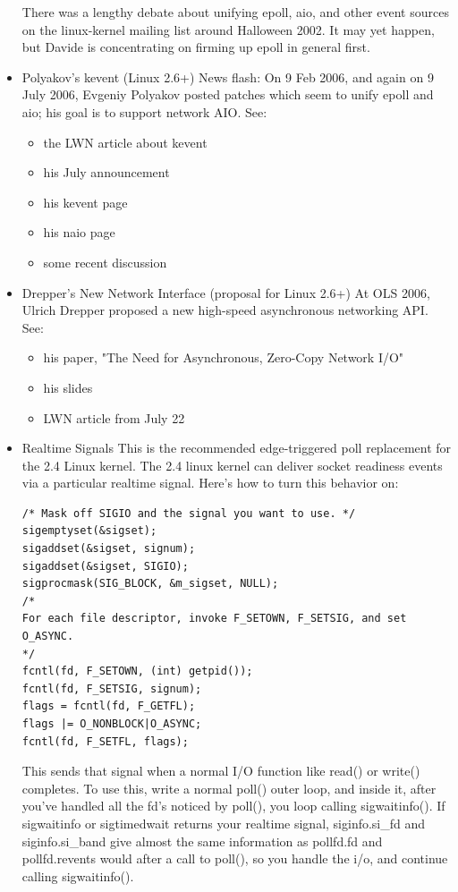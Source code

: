 \documentclass[12pt, twoside, a4paper, xetex]{report}
\begin{document}
\begin{itemize}
There was a lengthy debate about unifying epoll, aio, and other event sources on the linux-kernel mailing list around Halloween 2002. It may yet happen, but Davide is concentrating on firming up epoll in general first.

\item Polyakov's kevent (Linux 2.6+) News flash: On 9 Feb 2006, and again on 9 July 2006, Evgeniy Polyakov posted patches which seem to unify epoll and aio; his goal is to support network AIO. See:

\begin{itemize}
\item the LWN article about kevent
\item his July announcement
\item his kevent page
\item his naio page
\item some recent discussion
\end{itemize}

\item Drepper's New Network Interface (proposal for Linux 2.6+)
At OLS 2006, Ulrich Drepper proposed a new high-speed asynchronous networking API. See:

\begin{itemize}
\item his paper, "The Need for Asynchronous, Zero-Copy Network I/O"
\item his slides
\item LWN article from July 22
\end{itemize}

\item Realtime Signals
This is the recommended edge-triggered poll replacement for the 2.4 Linux kernel.
The 2.4 linux kernel can deliver socket readiness events via a particular realtime signal. Here's how to turn this behavior on:

\begin{verbatim}
/* Mask off SIGIO and the signal you want to use. */
sigemptyset(&sigset);
sigaddset(&sigset, signum);
sigaddset(&sigset, SIGIO);
sigprocmask(SIG_BLOCK, &m_sigset, NULL);
/* 
For each file descriptor, invoke F_SETOWN, F_SETSIG, and set O_ASYNC. 
*/
fcntl(fd, F_SETOWN, (int) getpid());
fcntl(fd, F_SETSIG, signum);
flags = fcntl(fd, F_GETFL);
flags |= O_NONBLOCK|O_ASYNC;
fcntl(fd, F_SETFL, flags);
\end{verbatim}

This sends that signal when a normal I/O function like read() or write() completes. To use this, write a normal poll() outer loop, and inside it, after you've handled all the fd's noticed by poll(), you loop calling sigwaitinfo().
If sigwaitinfo or sigtimedwait returns your realtime signal, siginfo.si\_fd and siginfo.si\_band give almost the same information as pollfd.fd and pollfd.revents would after a call to poll(), so you handle the i/o, and continue calling sigwaitinfo().


\end{itemize}
\end{document}
